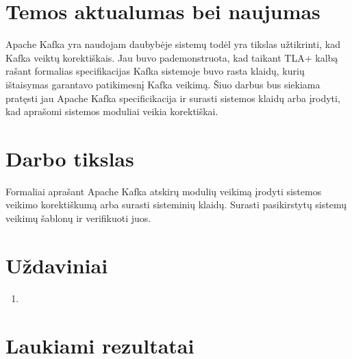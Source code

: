 \documentclass{VUMIFPSmagistrinis}
\begin{document}
	
	

\section{Temos aktualumas bei naujumas}
	Apache Kafka yra naudojam daubybėje sistemų todėl yra tikslas užtikrinti, kad Kafka veiktų korektiškais.
	Jau buvo pademonstruota, kad taikant TLA+ kalbą rašant formalias specifikacijas Kafka sistemoje buvo rasta klaidų, kurių ištaisymas garantavo patikimesnį Kafka veikimą.
	Šiuo darbus bus siekiama pratęsti jau Apache Kafka specificikacija ir surasti sistemos klaidų arba įrodyti, kad aprašomi sistemos moduliai veikia korektiškai.

\section{Darbo tikslas}
	Formaliai aprašant Apache Kafka atskirų modulių veikimą įrodyti sistemos veikimo korektiškumą arba surasti sisteminių klaidų.
	Surasti pasikirstytų sistemų veikimų šablonų ir verifikuoti juos.

\section{Uždaviniai}
	\begin{enumerate}
		\item{}
	\end{enumerate}

\section{Laukiami rezultatai}


\printbibliography[heading=bibintoc] 

\appendix
\end{document}
